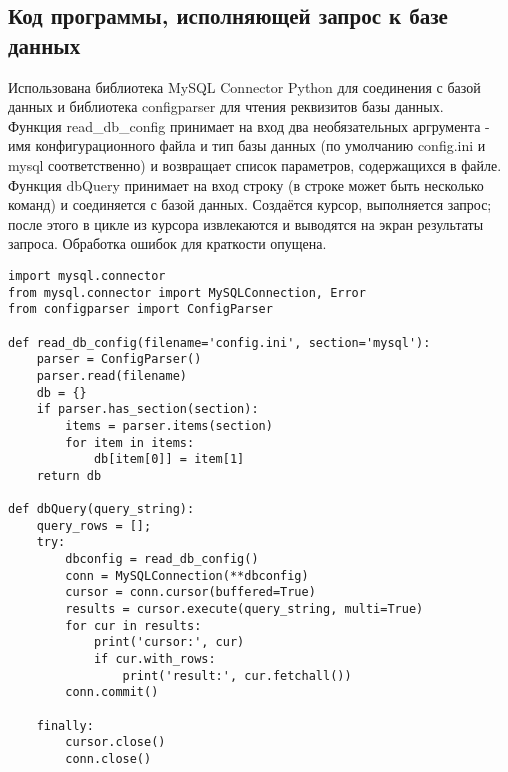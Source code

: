 \documentclass[zuevDbReport.tex]{subfiles}
\begin{document}
\subsection{Код программы, исполняющей запрос к базе данных}
\label{qCode}
Использована библиотека MySQL Connector Python для соединения с базой данных и библиотека configparser для чтения реквизитов базы данных.\\
Функция read\_db\_config принимает на вход два необязательных аргрумента - имя конфигурационного файла и тип базы данных (по умолчанию config.ini и mysql соответственно) и возвращает список параметров, содержащихся в файле.
Функция dbQuery принимает на вход строку (в строке может быть несколько команд) и соединяется с базой данных. Создаётся курсор, выполняется запрос; после этого в цикле из курсора извлекаются и выводятся на экран результаты запроса. Обработка ошибок для краткости опущена.\\
\begin{lstlisting}
import mysql.connector
from mysql.connector import MySQLConnection, Error
from configparser import ConfigParser

def read_db_config(filename='config.ini', section='mysql'):
    parser = ConfigParser()
    parser.read(filename)
    db = {}
    if parser.has_section(section):
        items = parser.items(section)
        for item in items:
            db[item[0]] = item[1]
    return db

def dbQuery(query_string):
    query_rows = [];
    try:
        dbconfig = read_db_config()
        conn = MySQLConnection(**dbconfig)
        cursor = conn.cursor(buffered=True)
        results = cursor.execute(query_string, multi=True)
        for cur in results:
            print('cursor:', cur)
            if cur.with_rows:
                print('result:', cur.fetchall())
        conn.commit()

    finally:
        cursor.close()
        conn.close()
\end{lstlisting}
\end{document}
